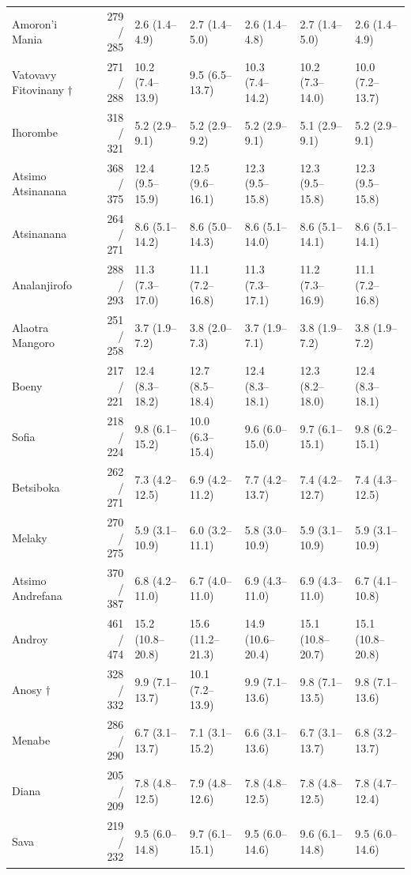\documentclass[11pt,a4paper]{article}
\begin{document}
\begin{landscape}
\begin{longtable}{l|rlllll}
Amoron'i Mania & 279 / 285 & 2.6 (1.4–4.9) & 2.7 (1.4–5.0) & 2.6 (1.4–4.8) & 2.7 (1.4–5.0) & 2.6 (1.4–4.9) \\ 
Vatovavy Fitovinany $\dagger$ & 271 / 288 & 10.2 (7.4–13.9) & 9.5 (6.5–13.7) & 10.3 (7.4–14.2) & 10.2 (7.3–14.0) & 10.0 (7.2–13.7) \\ 
Ihorombe & 318 / 321 & 5.2 (2.9–9.1) & 5.2 (2.9–9.2) & 5.2 (2.9–9.1) & 5.1 (2.9–9.1) & 5.2 (2.9–9.1) \\ 
Atsimo Atsinanana & 368 / 375 & 12.4 (9.5–15.9) & 12.5 (9.6–16.1) & 12.3 (9.5–15.8) & 12.3 (9.5–15.8) & 12.3 (9.5–15.8) \\ 
Atsinanana & 264 / 271 & 8.6 (5.1–14.2) & 8.6 (5.0–14.3) & 8.6 (5.1–14.0) & 8.6 (5.1–14.1) & 8.6 (5.1–14.1) \\ 
Analanjirofo & 288 / 293 & 11.3 (7.3–17.0) & 11.1 (7.2–16.8) & 11.3 (7.3–17.1) & 11.2 (7.3–16.9) & 11.1 (7.2–16.8) \\ 
Alaotra Mangoro & 251 / 258 & 3.7 (1.9–7.2) & 3.8 (2.0–7.3) & 3.7 (1.9–7.1) & 3.8 (1.9–7.2) & 3.8 (1.9–7.2) \\ 
Boeny & 217 / 221 & 12.4 (8.3–18.2) & 12.7 (8.5–18.4) & 12.4 (8.3–18.1) & 12.3 (8.2–18.0) & 12.4 (8.3–18.1) \\ 
Sofia & 218 / 224 & 9.8 (6.1–15.2) & 10.0 (6.3–15.4) & 9.6 (6.0–15.0) & 9.7 (6.1–15.1) & 9.8 (6.2–15.1) \\ 
Betsiboka & 262 / 271 & 7.3 (4.2–12.5) & 6.9 (4.2–11.2) & 7.7 (4.2–13.7) & 7.4 (4.2–12.7) & 7.4 (4.3–12.5) \\ 
Melaky & 270 / 275 & 5.9 (3.1–10.9) & 6.0 (3.2–11.1) & 5.8 (3.0–10.9) & 5.9 (3.1–10.9) & 5.9 (3.1–10.9) \\ 
Atsimo Andrefana & 370 / 387 & 6.8 (4.2–11.0) & 6.7 (4.0–11.0) & 6.9 (4.3–11.0) & 6.9 (4.3–11.0) & 6.7 (4.1–10.8) \\ 
Androy & 461 / 474 & 15.2 (10.8–20.8) & 15.6 (11.2–21.3) & 14.9 (10.6–20.4) & 15.1 (10.8–20.7) & 15.1 (10.8–20.8) \\ 
Anosy $\dagger$ & 328 / 332 & 9.9 (7.1–13.7) & 10.1 (7.2–13.9) & 9.9 (7.1–13.6) & 9.8 (7.1–13.5) & 9.8 (7.1–13.6) \\ 
Menabe & 286 / 290 & 6.7 (3.1–13.7) & 7.1 (3.1–15.2) & 6.6 (3.1–13.6) & 6.7 (3.1–13.7) & 6.8 (3.2–13.7) \\ 
Diana & 205 / 209 & 7.8 (4.8–12.5) & 7.9 (4.8–12.6) & 7.8 (4.8–12.5) & 7.8 (4.8–12.5) & 7.8 (4.7–12.4) \\ 
Sava & 219 / 232 & 9.5 (6.0–14.8) & 9.7 (6.1–15.1) & 9.5 (6.0–14.6) & 9.6 (6.1–14.8) & 9.5 (6.0–14.6) \\ 

\end{longtable}
\end{landscape}
\end{document}
